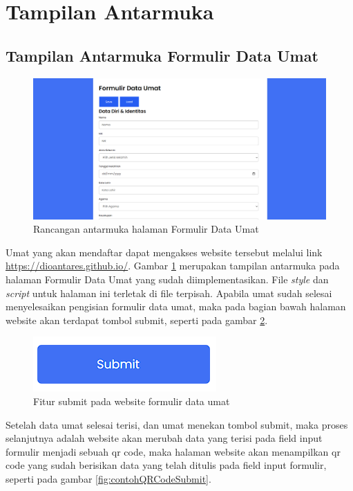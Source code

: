 \section{Tampilan Antarmuka}
\label{sec:tampilanAntarMuka}

\subsection{Tampilan Antarmuka Formulir Data Umat}
\label{sec:tampilanAntarmukaFormulir}

\begin{figure}[H]
	\centering
	\includegraphics[scale=0.41]{Gambar/halamanFormulir.png}
	\caption{Rancangan antarmuka halaman Formulir Data Umat} 
	\label{fig:formDataUmatFull}
\end{figure}

Umat yang akan mendaftar dapat mengakses website tersebut melalui link \url{https://dioantares.github.io/}. Gambar \ref{fig:formDataUmatFull} merupakan tampilan antarmuka pada halaman Formulir Data Umat yang sudah diimplementasikan. File \textit{style} dan \textit{script} untuk halaman ini terletak di file terpisah.  Apabila umat sudah selesai menyelesaikan pengisian formulir data umat, maka pada bagian bawah halaman website akan terdapat tombol submit, seperti pada gambar \ref{fig:fiturSubmit}.

\begin{figure}[H]
	\centering
	\includegraphics[scale=0.7]{Gambar/fiturSubmit.png}
	\caption{Fitur submit pada website formulir data umat} 
	\label{fig:fiturSubmit}
\end{figure}

Setelah data umat selesai terisi, dan umat menekan tombol submit, maka proses selanjutnya adalah website akan merubah data yang terisi pada field input formulir menjadi sebuah qr code, maka halaman website akan menampilkan qr code yang sudah berisikan data yang telah ditulis pada field input formulir, seperti pada gambar \ref{fig:contohQRCodeSubmit}.


